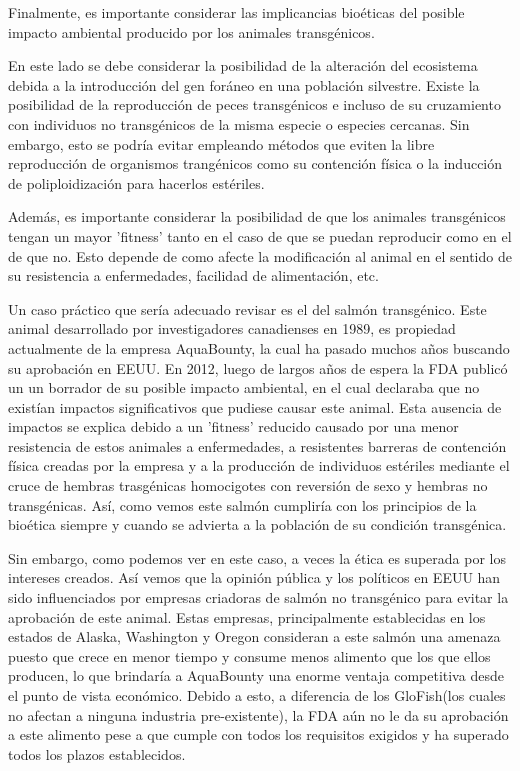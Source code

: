 \documentclass[fleqn,10pt]{SelfArx} %
\begin{document}
Finalmente, es importante considerar las implicancias bioéticas del posible impacto ambiental producido por los animales transgénicos. 

En este lado se debe considerar la posibilidad de la alteración del ecosistema debida a la introducción del gen foráneo en una población silvestre. Existe la posibilidad de la reproducción de peces transgénicos e incluso de su cruzamiento con individuos no transgénicos de la misma especie o especies cercanas\cite{espinoza2012reproduccion, oke2013hybridization}. Sin embargo, esto se podría evitar empleando métodos que eviten la libre reproducción de organismos trangénicos como su contención física o la inducción de poliploidización para hacerlos estériles\cite{pandian1998ploidy,wong2008transgenic}.

Además, es importante considerar la posibilidad de que los animales transgénicos tengan un mayor 'fitness' tanto en el caso de que se puedan reproducir como en el de que no. Esto depende de como afecte la modificación al animal en el sentido de su resistencia a enfermedades, facilidad de alimentación, etc\cite{devlin2006interface}. 

Un caso práctico que sería adecuado revisar es el del salmón transgénico. Este animal desarrollado por investigadores canadienses en 1989, es propiedad actualmente de la empresa AquaBounty, la cual ha pasado muchos años buscando su aprobación en EEUU. En 2012, luego de largos años de espera la FDA publicó un un borrador de su posible impacto ambiental, en el cual declaraba que no existían impactos significativos que pudiese causar este animal. Esta ausencia de impactos se explica debido a un 'fitness' reducido causado por una menor resistencia de estos animales a enfermedades, a resistentes barreras de contención física creadas por la empresa y a la producción de individuos estériles mediante el cruce de hembras trasgénicas homocigotes con reversión de sexo y hembras no transgénicas. Así, como vemos este salmón cumpliría con los principios de la bioética siempre y cuando se advierta a la población de su condición transgénica\cite{smith2010genetically, ledford2013transgenic}.

Sin embargo, como podemos ver en este caso, a veces la ética es superada por los intereses creados. Así vemos que la opinión pública y los políticos en EEUU han sido influenciados por empresas criadoras de salmón no transgénico para evitar la aprobación de este animal. Estas empresas, principalmente establecidas en los estados de Alaska, Washington y Oregon consideran a este salmón una amenaza puesto que crece en menor tiempo y consume menos alimento que los que ellos producen, lo que brindaría a AquaBounty una enorme ventaja competitiva desde el punto de vista económico. Debido a esto, a diferencia de los GloFish(los cuales no afectan a ninguna industria pre-existente), la FDA aún no le da su aprobación a este alimento pese a que cumple con todos los requisitos exigidos y ha superado todos los plazos establecidos\cite{food2003fda, maxmen2012politics, ledford2013transgenic}. 
\end{document}
